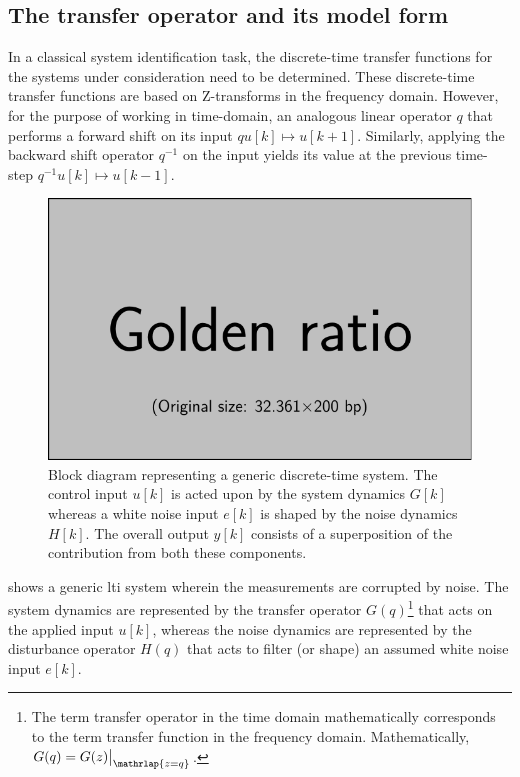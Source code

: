 
\subsection{The transfer operator and its model form}
In a classical system identification  task, the discrete-time transfer functions
for the systems  under consideration need to be  determined. These discrete-time
transfer functions are  based on Z-transforms in the  frequency domain. However,
for the purpose of working in time-domain, an analogous linear operator $q$ that
performs a  forward shift on  its input \ie{} $  {q u[k] \longmapsto  u[k+1]} $.
Similarly, applying the  backward shift operator $ q^{-1} $  on the input yields
its value at the previous time-step \ie{} $ {q^{-1} u[k] \longmapsto u[k-1]}$.

\begin{figure}[!htbp]
    \centering
    \includegraphics{placeholder_images/example-image-golden.pdf}
    \caption[Block diagram representing a generic discrete-time  system]{%
        Block  diagram representing  a  generic discrete-time  
        system. The  control input $u[k]$ is  acted upon by the  system dynamics
        $G[k]$  whereas a  white  noise  input $e[k]$  is  shaped  by the  noise
        dynamics $H[k]$. The  overall output $y[k]$ consists  of a superposition
        of the contribution from both these components.
    }%
    \label{fig:genericltisyswithnoise}
\end{figure}

 shows  a generic \gls{lti} system  wherein the
measurements are corrupted by noise. The  system dynamics are represented by the
transfer operator $G(q)$\footnote{The term transfer  operator in the time domain
mathematically  corresponds  to the  term  transfer  function in  the  frequency
domain.  Mathematically,  $G(q) =  G(z)\bigr\rvert_{\mathrlap{z=q}}$.}  that  acts on  the
applied  input  $u[k]$,  whereas  the  noise dynamics  are  represented  by  the
disturbance operator  $H(q)$ that  acts to  filter (or  shape) an  assumed white
noise input $e[k]$.


